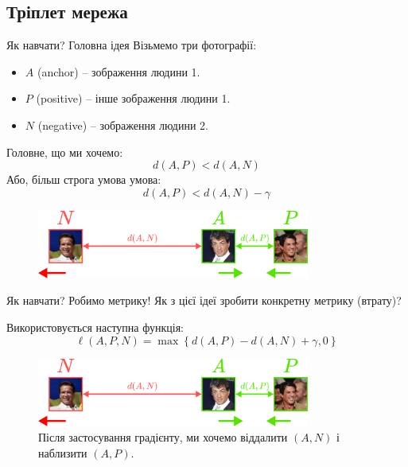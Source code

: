 \documentclass{zkdl-presentation-template}
\begin{document}
    \subsection{Тріплет мережа}
    \begin{frame}{Як навчати? Головна ідея}
        Візьмемо три фотографії:
        \begin{itemize}
            \item $A$ (anchor) -- зображення людини 1.
            \item $P$ (positive) -- інше зображення людини 1.
            \item $N$ (negative) -- зображення людини 2.
        \end{itemize}
        Головне, що ми хочемо:
        \begin{equation*}
            d(A,P) < d(A,N)
        \end{equation*}
        Або, більш строга умова умова:
        \begin{equation*}
            d(A,P) < d(A,N) - \gamma
        \end{equation*}
        

        \begin{figure}
        \centering
            \includegraphics[width=0.8\textwidth]{images/triplet_dist.png}
        \end{figure}
    \end{frame}

    \begin{frame}{Як навчати? Робимо метрику!}
        Як з цієї ідеї зробити конкретну метрику (втрату)? 
        
        Використовується наступна функція:
        \begin{equation*}
            \ell(A,P,N) = \max\left\{d(A,P)-d(A,N)+\gamma,0\right\}
        \end{equation*}

        \begin{figure}
        \centering
            \includegraphics[width=0.8\textwidth]{images/triplet_dist.png}
            \caption{Після застосування градієнту, ми хочемо віддалити $(A,N)$ і наблизити $(A,P)$.}
        \end{figure}
    \end{frame}
\end{document}
